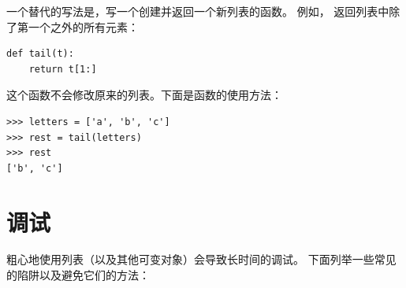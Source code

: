 一个替代的写法是，写一个创建并返回一个新列表的函数。
例如， 返回列表中除了第一个之外的所有元素：

\begin{lstlisting}
def tail(t):
    return t[1:]
\end{lstlisting}

%

这个函数不会修改原来的列表。下面是函数的使用方法：

\begin{lstlisting}
>>> letters = ['a', 'b', 'c']
>>> rest = tail(letters)
>>> rest
['b', 'c']
\end{lstlisting}


\section{调试}


粗心地使用列表（以及其他可变对象）会导致长时间的调试。
下面列举一些常见的陷阱以及避免它们的方法：

